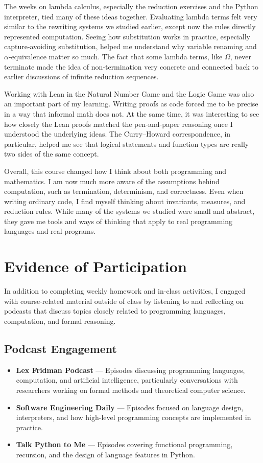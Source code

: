 \documentclass{article}
\theoremstyle{theorem}
\theoremstyle{definition}
\theoremstyle{remark}
\begin{document}
The weeks on lambda calculus, especially the reduction exercises and the Python interpreter, tied many of these ideas together. Evaluating lambda terms felt very similar to the rewriting systems we studied earlier, except now the rules directly represented computation. Seeing how substitution works in practice, especially capture-avoiding substitution, helped me understand why variable renaming and $\alpha$-equivalence matter so much. The fact that some lambda terms, like $\Omega$, never terminate made the idea of non-termination very concrete and connected back to earlier discussions of infinite reduction sequences.

Working with Lean in the Natural Number Game and the Logic Game was also an important part of my learning. Writing proofs as code forced me to be precise in a way that informal math does not. At the same time, it was interesting to see how closely the Lean proofs matched the pen-and-paper reasoning once I understood the underlying ideas. The Curry–Howard correspondence, in particular, helped me see that logical statements and function types are really two sides of the same concept.

Overall, this course changed how I think about both programming and mathematics. I am now much more aware of the assumptions behind computation, such as termination, determinism, and correctness. Even when writing ordinary code, I find myself thinking about invariants, measures, and reduction rules. While many of the systems we studied were small and abstract, they gave me tools and ways of thinking that apply to real programming languages and real programs.


\section{Evidence of Participation}

In addition to completing weekly homework and in-class activities, I engaged with course-related material outside of class by listening to and reflecting on podcasts that discuss topics closely related to programming languages, computation, and formal reasoning.

\subsection*{Podcast Engagement}

\begin{itemize}
  \item \textbf{Lex Fridman Podcast} — Episodes discussing programming languages, computation, and artificial intelligence, particularly conversations with researchers working on formal methods and theoretical computer science.
  \item \textbf{Software Engineering Daily} — Episodes focused on language design, interpreters, and how high-level programming concepts are implemented in practice.
  \item \textbf{Talk Python to Me} — Episodes covering functional programming, recursion, and the design of language features in Python.
\end{itemize}
\end{document}
